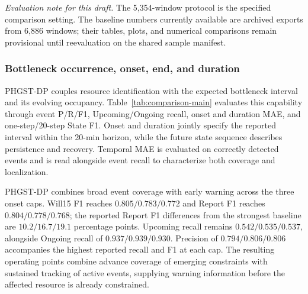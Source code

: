 \documentclass[a4paper,fleqn]{cas-dc}
\begin{document}
\textit{Evaluation note for this draft.} The 5,354-window protocol is the specified comparison setting. The baseline numbers currently available are archived exports from 6,886 windows; their tables, plots, and numerical comparisons remain provisional until reevaluation on the shared sample manifest.

\subsubsection{Bottleneck occurrence, onset, end, and duration}\label{sec:comparison-event}

PHGST-DP couples resource identification with the expected bottleneck interval and its evolving occupancy. Table~\ref{tab:comparison-main} evaluates this capability through event P/R/F1, Upcoming/Ongoing recall, onset and duration MAE, and one-step/20-step State F1. Onset and duration jointly specify the reported interval within the 20-min horizon, while the future state sequence describes persistence and recovery. Temporal MAE is evaluated on correctly detected events and is read alongside event recall to characterize both coverage and localization.

PHGST-DP combines broad event coverage with early warning across the three onset caps. Will15 F1 reaches $0.805/0.783/0.772$ and Report F1 reaches $0.804/0.778/0.768$; the reported Report F1 differences from the strongest baseline are $10.2/16.7/19.1$ percentage points. Upcoming recall remains $0.542/0.535/0.537$, alongside Ongoing recall of $0.937/0.939/0.930$. Precision of $0.794/0.806/0.806$ accompanies the highest reported recall and F1 at each cap. The resulting operating points combine advance coverage of emerging constraints with sustained tracking of active events, supplying warning information before the affected resource is already constrained.
\end{document}
